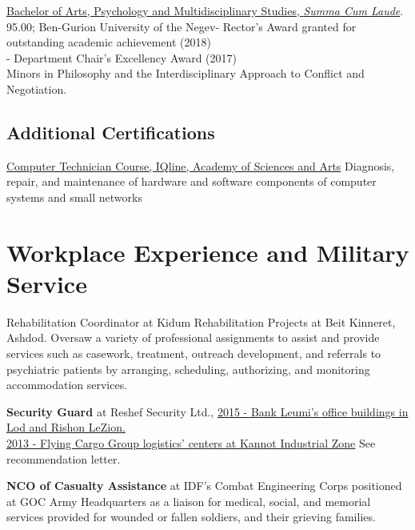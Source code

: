 {\href{https://www.dropbox.com/s/pcm0mybvgi85ma0/BA-Psych.pdf?dl=0}{Bachelor of Arts, Psychology and Multidisciplinary Studies, \textit{Summa Cum Laude}}. 95.00; Ben-Gurion University of the Negev}{- Rector's Award granted for outstanding academic achievement (2018) \\
- Department Chair’s Excellency Award (2017) \\
Minors in Philosophy and the Interdisciplinary Approach to Conflict and Negotiation.}

\subsection{Additional Certifications}
{\href{https://www.dropbox.com/s/csphxdynjdg3ze2/computer-technitian-certificate.jpg?dl=0}{Computer Technician Course, IQline, Academy of Sciences and Arts}}
{Diagnosis, repair, and maintenance of hardware and software components of computer systems and small networks}
{}

\section{Workplace Experience and Military Service}

{Rehabilitation Coordinator at Kidum Rehabilitation Projects at Beit Kinneret, Ashdod.}
{Oversaw a variety of professional assignments to assist and provide services such as casework, treatment, outreach development, and referrals to psychiatric patients by arranging, scheduling, authorizing, and monitoring accommodation services.}
{}

{\textbf{Security Guard} at Reshef Security Ltd.,} 
{\href{https://www.dropbox.com/s/kr5rcui1zgp35i0/recommendation-letter-security-guard.jpg?dl=0}{2015 - Bank Leumi's office buildings in Lod and Rishon LeZion. \\
2013 - Flying Cargo Group logistics' centers at Kannot Industrial Zone}}
{{See recommendation letter.}}

{\textbf{NCO of Casualty Assistance} at IDF's Combat Engineering Corps} 
{positioned at GOC Army Headquarters as a liaison for medical, social, and memorial services provided for wounded or fallen soldiers, and their grieving families.}
{}

